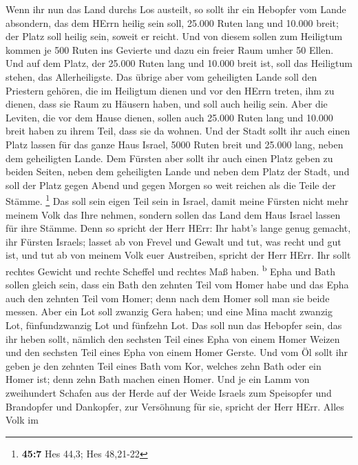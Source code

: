  Wenn ihr nun das Land durchs Los austeilt, so sollt ihr
ein Hebopfer vom Lande absondern, das dem HErrn heilig sein soll, 25.000
Ruten lang und 10.000 breit; der Platz soll heilig sein, soweit er
reicht.  Und von diesem sollen zum Heiligtum kommen je 500
Ruten ins Gevierte und dazu ein freier Raum umher 50 Ellen.
 Und auf dem Platz, der 25.000 Ruten lang und 10.000 breit
ist, soll das Heiligtum stehen, das Allerheiligste.  Das
übrige aber vom geheiligten Lande soll den Priestern gehören, die im
Heiligtum dienen und vor den HErrn treten, ihm zu dienen, dass sie Raum
zu Häusern haben, und soll auch heilig sein.  Aber die
Leviten, die vor dem Hause dienen, sollen auch 25.000 Ruten lang und
10.000 breit haben zu ihrem Teil, dass sie da wohnen.  Und
der Stadt sollt ihr auch einen Platz lassen für das ganze Haus Israel,
5000 Ruten breit und 25.000 lang, neben dem geheiligten Lande.
 Dem Fürsten aber sollt ihr auch einen Platz geben zu
beiden Seiten, neben dem geheiligten Lande und neben dem Platz der
Stadt, und soll der Platz gegen Abend und gegen Morgen so weit reichen
als die Teile der Stämme. \footnote{\textbf{45:7} Hes 44,3; Hes 48,21-22}
 Das soll sein eigen Teil sein in Israel, damit meine
Fürsten nicht mehr meinem Volk das Ihre nehmen, sondern sollen das Land
dem Haus Israel lassen für ihre Stämme.  Denn so spricht
der Herr HErr: Ihr habt's lange genug gemacht, ihr Fürsten Israels;
lasset ab von Frevel und Gewalt und tut, was recht und gut ist, und tut
ab von meinem Volk euer Austreiben, spricht der Herr HErr.
 Ihr sollt rechtes Gewicht und rechte Scheffel und
rechtes Maß haben. \textsuperscript{b}  Epha und Bath
sollen gleich sein, dass ein Bath den zehnten Teil vom Homer habe und
das Epha auch den zehnten Teil vom Homer; denn nach dem Homer soll man
sie beide messen.  Aber ein Lot soll zwanzig Gera haben;
und eine Mina macht zwanzig Lot, fünfundzwanzig Lot und fünfzehn Lot.
 Das soll nun das Hebopfer sein, das ihr heben sollt,
nämlich den sechsten Teil eines Epha von einem Homer Weizen und den
sechsten Teil eines Epha von einem Homer Gerste.  Und vom
Öl sollt ihr geben je den zehnten Teil eines Bath vom Kor, welches zehn
Bath oder ein Homer ist; denn zehn Bath machen einen Homer.
 Und je ein Lamm von zweihundert Schafen aus der Herde
auf der Weide Israels zum Speisopfer und Brandopfer und Dankopfer, zur
Versöhnung für sie, spricht der Herr HErr.  Alles Volk im

